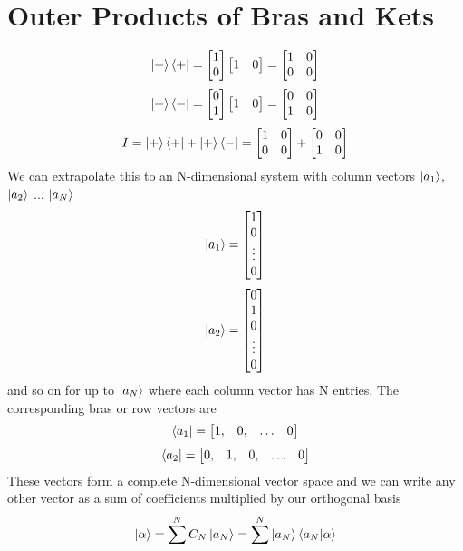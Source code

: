 \documentclass{book}
\begin{document}
\section{Outer Products of Bras and Kets}
$$\ket{+} \bra{+} = \begin{bmatrix} 1 \\ 0 \end{bmatrix}  \begin{bmatrix} 1 & 0 \end{bmatrix} = \begin{bmatrix} 1 & 0 \\ 0 & 0 \end{bmatrix}$$
$$\ket{+} \bra{-} = \begin{bmatrix} 0 \\ 1 \end{bmatrix}  \begin{bmatrix} 1 & 0 \end{bmatrix} = \begin{bmatrix} 0 & 0 \\ 1 & 0 \end{bmatrix}$$
$$ I = \ket{+} \bra{+} + \ket{+} \bra{-} = \begin{bmatrix} 1 & 0 \\ 0 & 0 \end{bmatrix} + \begin{bmatrix} 0 & 0 \\ 1 & 0 \end{bmatrix} $$
We can extrapolate this to an N-dimensional system with column vectors $\ket{a_1}$, $\ket{a_2}$ ... $\ket{a_N}$
$$\ket{a_1} = \begin{bmatrix} 1 \\ 0 \\ \vdots \\ 0 \end{bmatrix}$$
$$\ket{a_2} = \begin{bmatrix} 0 \\ 1 \\ 0 \\ \vdots \\ 0 \end{bmatrix}$$
and so on for up to $\ket{a_N}$ where each column vector has N entries. The corresponding bras or row vectors are
$$\bra{a_1} = \begin{bmatrix} 1, & 0, & \hdots & 0 \end{bmatrix}$$
$$\bra{a_2} = \begin{bmatrix} 0, & 1, & 0, & \hdots & 0 \end{bmatrix}$$
These vectors form a complete N-dimensional vector space and we can write any other vector as a sum of coefficients multiplied by our orthogonal basis
$$ \ket{\alpha} = \sum^N C_N\ket{a_N} = \sum^N \ket{a_N} \bra{a_N} \ket{\alpha} $$
\end{document}
